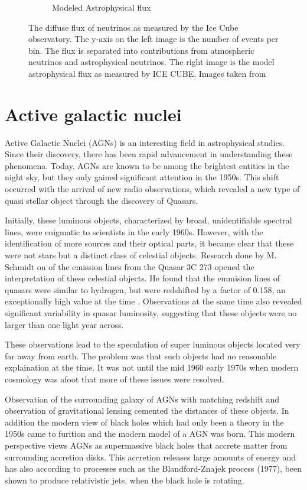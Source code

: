 \documentclass{article}
\begin{document}
\begin{figure}
\begin{subfigure}[b]{0.5\textwidth}
        \caption{Modeled Astrophysical flux}
    \end{subfigure}
    \caption{The diffuse flux of neutrinos as measured by the Ice Cube observatory. The y-axis on the left image is the number of events per bin.  The flux is separated into contributions from atmospheric neutrinos and astrophysical neutrinos. The right image is the model astrophysical flux as measured by ICE CUBE. Images taken from \cite{Abbasi_2022} }
    \label{fig:flux_neutrinos}
\end{figure}






\section{Active galactic nuclei}




Active Galactic Nuclei (AGNs) is an interesting field in astrophysical studies. 
Since their discovery, there has been rapid advancement in understanding these phenomena.
Today, AGNs are known to be among the brightest entities in the night sky,
but they only gained significant attention in the 1950s. 
This shift occurred with the arrival of new radio observations, which revealed a new type of quasi stellar
object through the discovery of Quasars.

Initially, these luminous objects, characterized by broad, 
unidentifiable spectral lines, were enigmatic to scientists in the early 1960s. 
However, with the identification of more sources and their optical parts, 
it became clear that these were not stars but a distinct class of celestial objects. 
Research done by M. Schmidt on of the emission lines from 
the Quasar 3C 273 opened the interpretation of these celestial objects. 
He found that the emmision lines of quasars were similar to hydrogen, but were redshifted by a factor of 0.158,
an exceptionally high value at the time \cite{Shields_1999}. Observations at the same time also revealed significant 
variability in quasar luminosity, suggesting that these objects were no larger than one light year across. 

These observations lead to the speculation of super luminous objects located very far away from earth. The problem was that such objects
had no reasonable explaination at the time. It was not until the mid 1960 early 1970s when modern cosmology was 
afoot that more of these issues were resolved.

Observation of the surrounding galaxy of AGNs with matching redshift and observation of gravitational lensing cemented 
the distances of these objects. In addition the modern view of black holes which had only been a theory in the 1950s came to
furition and the modern model of a AGN was born. This modern perspective views AGNs as supermassive black holes that
accrete matter from surrounding accretion disks. This accretion releases large amounts of energy and has also according to 
processes such as  the Blandford-Znajek process (1977), been shown to produce relativistic jets, when the black hole is rotating.
\end{document}
